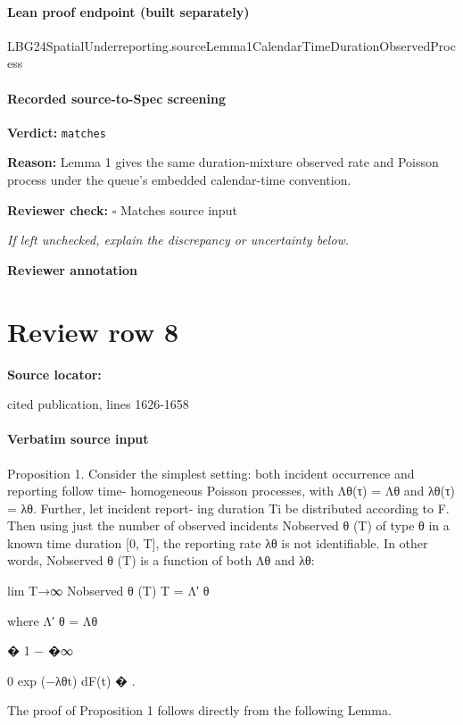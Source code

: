 \documentclass[10pt]{article}
\newcommand{\reviewerbox}{%
  \par\noindent\fbox{\parbox{0.96\linewidth}{\rule{0pt}{0.38in}}}\par
}
\newcommand{\reviewmatch}[1]{%
  \par\noindent\textbf{Reviewer check:} $\square$\; #1\par
  \noindent\emph{If left unchecked, explain the discrepancy or uncertainty below.}\par
}
\begin{document}
\paragraph{Lean proof endpoint (built separately)}\begin{ReviewVerbatim}
LBG24SpatialUnderreporting.sourceLemma1CalendarTimeDurationObservedProcess
\end{ReviewVerbatim}

\paragraph{Recorded source-to-Spec screening}
\textbf{Verdict:} \texttt{matches}
\\
{\raggedright
\textbf{Reason:} Lemma 1 gives the same duration-\allowbreak{}mixture observed rate and Poisson process under the queue's embedded calendar-\allowbreak{}time convention.\allowbreak{}
\par}
\reviewmatch{Matches source input}
\noindent\textbf{Reviewer annotation}\par
\reviewerbox
\clearpage
\hypertarget{source-claim-314139008a3bface}{}
\section*{Review row 8}
\textbf{Source locator:} {\footnotesize\raggedright cited publication, lines 1626-\allowbreak{}1658\par}
\paragraph{Verbatim source input}
\begin{ReviewVerbatim}
Proposition 1. Consider the simplest setting: both incident occurrence and reporting follow time-
homogeneous Poisson processes, with Λθ(τ) = Λθ and λθ(τ) = λθ. Further, let incident report-
ing duration Ti be distributed according to F. Then using just the number of observed incidents
Nobserved
θ
(T) of type θ in a known time duration [0, T], the reporting rate λθ is not identifiable. In
other words, Nobserved
θ
(T) is a function of both Λθ and λθ:

lim
T→∞
Nobserved
θ
(T)
T
= Λ′
θ

where
Λ′
θ = Λθ

�
1 −
�∞

0
exp (−λθt) dF(t)
�
.

The proof of Proposition 1 follows directly from the following Lemma.
\end{ReviewVerbatim}
\end{document}
